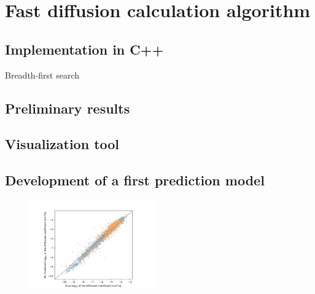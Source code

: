 \documentclass[main]{subfiles}
\begin{document}
\section{Fast diffusion calculation algorithm}

\subsection{Implementation in C++}

Breadth-first search

\subsection{Preliminary results}

\subsection{Visualization tool}


\subsection{Development of a first prediction model}

\begin{figure}[ht]
  \centering
    \includegraphics[width=0.48\textwidth]{figures/5-diffusion/diffusion_prediction.pdf}
    \caption{}\label{fgr:}
\end{figure}
\end{document}
